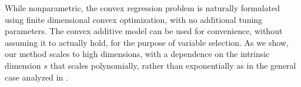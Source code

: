 While nonparametric, the convex regression problem is naturally
formulated using finite dimensional convex optimization, with no
additional tuning parameters.  The convex additive model can be used
for convenience, without assuming it to actually hold, for the purpose
of variable selection.  As we show, our method scales to high
dimensions, with a dependence on the intrinsic dimension $s$ that
scales polynomially, rather than exponentially as in the general case
analyzed in \cite{dalalyan:12}.



%
%
%
%
%
%
%
%


